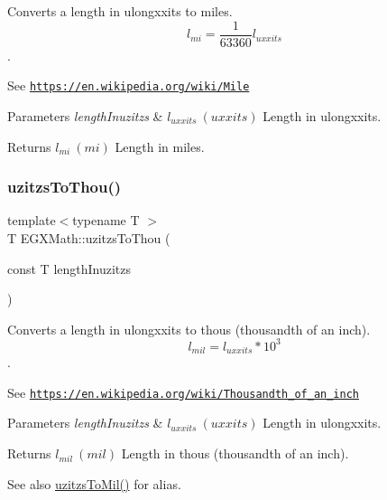 Converts a length in ulongxxits to miles. \[ l_{mi}=\frac{1}{63360} l_{uxxits} \]. 

See \href{https://en.wikipedia.org/wiki/Mile}{\tt https\+://en.\+wikipedia.\+org/wiki/\+Mile} 
\begin{DoxyParams}{Parameters}
{\em length\+Inuzitzs} & $ l_{uxxits}\ (uxxits)$ Length in ulongxxits. \\
\hline
\end{DoxyParams}
\begin{DoxyReturn}{Returns}
$ l_{mi}\ (mi)$ Length in miles. 
\end{DoxyReturn}
\mbox{\label{group___e_g_x_math-_conversions-_length_conversions-uzitzs-_imperial_gaa11694f9026bf30e29bd716a35c05b4e}} 
\subsubsection{\texorpdfstring{uzitzs\+To\+Thou()}{uzitzsToThou()}}
{\footnotesize\ttfamily template$<$typename T $>$ \\
T E\+G\+X\+Math\+::uzitzs\+To\+Thou (\begin{DoxyParamCaption}\item[{const T}]{length\+Inuzitzs }\end{DoxyParamCaption})}



Converts a length in ulongxxits to thous (thousandth of an inch). \[ l_{mil}=l_{uxxits} * 10^{3} \]. 

See \href{https://en.wikipedia.org/wiki/Thousandth_of_an_inch}{\tt https\+://en.\+wikipedia.\+org/wiki/\+Thousandth\+\_\+of\+\_\+an\+\_\+inch} 
\begin{DoxyParams}{Parameters}
{\em length\+Inuzitzs} & $ l_{uxxits}\ (uxxits)$ Length in ulongxxits. \\
\hline
\end{DoxyParams}
\begin{DoxyReturn}{Returns}
$ l_{mil}\ (mil)$ Length in thous (thousandth of an inch). 
\end{DoxyReturn}
\begin{DoxySeeAlso}{See also}
\mbox{\hyperlink{group___e_g_x_math-_conversions-_length_conversions-uzitzs-_imperial_ga53d4abecb2e7ac39c15c4ef89b9447a9}{uzitzs\+To\+Mil()}} for alias. 
\end{DoxySeeAlso}
\mbox{\label{group___e_g_x_math-_conversions-_length_conversions-uzitzs-_imperial_ga3281bb64c81bc68a166a47ccc1f9a146}} 
